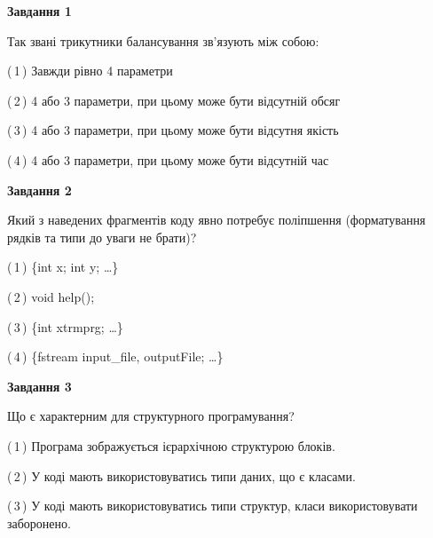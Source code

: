 \documentclass[10pt, ukrainian]{article}
\begin{document}
{
\begin {large}
{\begin {center}\textbf{Завдання 1}\end {center}}\par
Так звані трикутники балансування зв'язують між собою:\par
\vspace{2mm}



(\,1\,) Завжди рівно 4 параметри%



(\,2\,) 4 або 3 параметри, при цьому може бути відсутній обсяг %



(\,3\,) 4 або 3 параметри, при цьому може бути відсутня якість%



(\,4\,) 4 або 3 параметри, при цьому може бути відсутній час%


{\begin {center}\textbf{Завдання 2}\end {center}}\par
Який з наведених фрагментів коду явно потребує поліпшення (форматування рядків та типи до уваги не брати)?\par
\vspace{2mm}



(\,1\,) \{int x; int y; …\}%



(\,2\,) void help();%



(\,3\,) \{int xtrmprg; …\}%



(\,4\,) \{fstream input\_file, outputFile; …\}%


{\begin {center}\textbf{Завдання 3}\end {center}}\par
Що є характерним для структурного програмування?\par
\vspace{2mm}



(\,1\,) Програма зображується ієрархічною структурою блоків.%



(\,2\,) У коді мають використовуватись типи даних, що є класами. %



(\,3\,) У коді мають використовуватись типи структур, класи використовувати заборонено. %




\end{large}}
\end{document}
